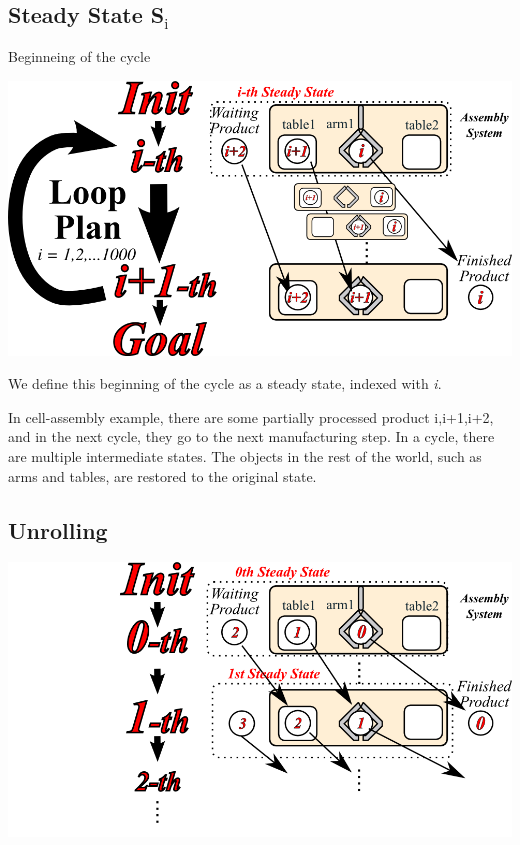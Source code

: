 \subsection{Steady State S\(_{\text{i}}\)}
\label{sec-5-1}

\begin{alignright}
Beginneing of the cycle
\end{alignright}

\includegraphics[width=\textwidth]{img/steady-state.png}

\begin{resume}
We define this beginning of the cycle as a steady state, indexed with \emph{i}.

In cell-assembly example,
there are some partially processed product i,i+1,i+2,
and in the next cycle, they go to the next manufacturing step.
In a cycle, there are multiple intermediate states.
The objects in the rest of the world, such as arms and tables,
are restored to the original state.
\end{resume}

\subsection{Unrolling}
\label{sec-5-2}
\includegraphics[width=\textwidth]{img/unroll.png}

